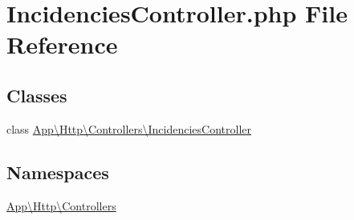 \hypertarget{_incidencies_controller_8php}{}\section{Incidencies\+Controller.\+php File Reference}
\label{_incidencies_controller_8php}
\subsection*{Classes}
\begin{DoxyCompactItemize}
\item 
class \mbox{\hyperlink{class_app_1_1_http_1_1_controllers_1_1_incidencies_controller}{App\textbackslash{}\+Http\textbackslash{}\+Controllers\textbackslash{}\+Incidencies\+Controller}}
\end{DoxyCompactItemize}
\subsection*{Namespaces}
\begin{DoxyCompactItemize}
\item 
 \mbox{\hyperlink{namespace_app_1_1_http_1_1_controllers}{App\textbackslash{}\+Http\textbackslash{}\+Controllers}}
\end{DoxyCompactItemize}
